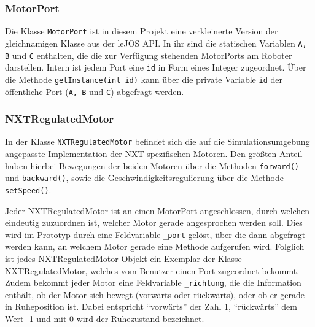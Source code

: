 \documentclass[paper=a4, DIV=14, BCOR=15mm, twoside=on, onecolumn=on, open = right, titlepage =on, parskip =half, headsepline = on, footsepline = on, chapterprefix = on, appendixprefix = off, fontsize = 12pt, numbers = noenddot, abstract = on]{scrbook}
\begin{document}
\subsubsection{MotorPort}
Die Klasse \texttt{MotorPort} ist in diesem Projekt eine verkleinerte Version der gleichnamigen Klasse aus der leJOS API. In ihr sind die statischen Variablen \texttt{A, B} und \texttt{C} enthalten, die die zur Verfügung stehenden MotorPorts am Roboter darstellen. Intern ist jedem Port eine \texttt{id} in Form eines Integer zugeordnet. Über die Methode \texttt{get\-In\-stance(int id)} kann über die private Variable \texttt{id} der öffentliche Port (\texttt{A, B} und \texttt{C}) abgefragt werden.

\subsubsection{NXTRegulatedMotor}
In der Klasse \texttt{NXTRegulatedMotor} befindet sich die auf die Simulationsumgebung angepasste Implementation der NXT-spezifischen Motoren. Den größten Anteil haben hierbei Bewegungen der beiden Motoren über die Methoden \texttt{for\-ward()} und \texttt{back\-ward()}, sowie die Geschwindigkeitsregulierung über die Methode \texttt{set\-Speed()}. 

Jeder NXTRegulatedMotor ist an einen MotorPort angeschlossen, durch welchen eindeutig zuzuordnen ist, welcher Motor gerade angesprochen werden soll. Dies wird im Prototyp durch eine Feldvariable \texttt{{\_}port} gelöst, über die dann abgefragt werden kann, an welchem Motor gerade eine Methode aufgerufen wird. Folglich ist jedes NXT\-Regulated\-Motor\--Objekt ein Exemplar der Klasse NXTRegulatedMotor, welches vom Benutzer einen Port zugeordnet bekommt.\\
Zudem bekommt jeder Motor eine Feldvariable \texttt{{\_}richtung}, die die Information enthält, ob der Motor sich bewegt (vorwärts oder rückwärts), oder ob er gerade in Ruheposition ist. Dabei entspricht "`vorwärts"' der Zahl 1, "`rückwärts"' dem Wert -1 und mit 0 wird der Ruhezustand bezeichnet.
\end{document}
